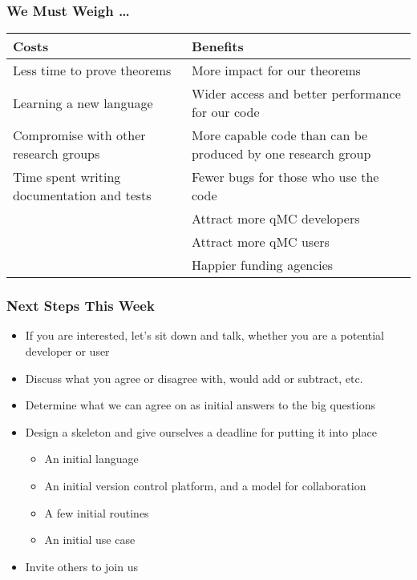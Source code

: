 \documentclass[11pt,compress,xcolor={usenames,dvipsnames},aspectratio=169]{beamer}
\begin{document}
\begin{frame}
\frametitle{We Must Weigh \ldots}

\vspace{-7ex}

\setlength{\extrarowheight}{1ex}
\begin{tabular}
{p{}p{}}
\alert{\Large Costs} & \alert{\Large Benefits} \tabularnewline
\toprule
Less time to prove theorems &
More impact for our theorems \tabularnewline
Learning a new language & 
Wider access and better performance for our code \tabularnewline
Compromise with other research groups &
More capable code than can be produced by one research group \tabularnewline
Time spent writing documentation and tests &
Fewer bugs for those who use the code \tabularnewline
&
Attract more qMC developers \tabularnewline
&
Attract more qMC users \tabularnewline
&
Happier funding agencies \tabularnewline

\end{tabular}
\end{frame}

\begin{frame}
\frametitle{Next Steps This Week}
\begin{itemize}[<+-| alert@+>]
\item If you are interested, let's sit down and talk, whether you are a potential developer or user

\item Discuss what you agree or disagree with, would add or subtract, etc.

\item Determine what we can agree on as initial answers to the big questions

\item Design a skeleton and give ourselves a deadline for putting it into place
\begin{itemize}
\item An initial language

\item An initial version control platform, and a model for collaboration
\item A few initial routines
\item An initial use case
\end{itemize}

\item Invite others to join us

\end{itemize}

\end{frame}
\end{document}
